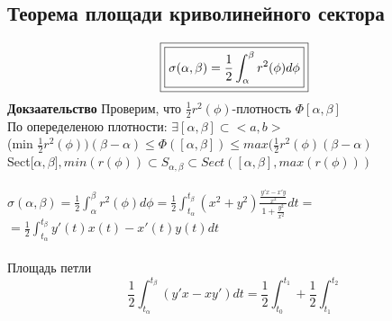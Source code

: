 \documentclass[12pt, a4paper]{article}
\begin{document}
	\subsection{Теорема площади криволинейного сектора}
	\[
	\boxed{\boxed{ \sigma(\alpha,\beta)=\frac{1}{2} \int_{\alpha}^{\beta}r^2(\phi) d\phi}}\\
	\]
	\textbf{Докзаательство}
	Проверим, что $\frac{1}{2}r^2(\phi)$-плотность $\Phi[\alpha,\beta]$\\
	По опеределеною плотности: $\exists [\alpha, \beta] \subset <a,b>$ \\
	(min $\frac{1}{2}r^2(\phi))(\beta - \alpha) \leq  \Phi([\alpha,\beta])\leq max(\frac{1}{2}r^2(\phi)( \beta -    \alpha)$\\
	Sect[$ \alpha,\beta ], min(r( \phi )) \subset S_{ \alpha,\beta } \subset Sect([ \alpha,\beta ], max(r( \phi )))$\\
	\\
	$\sigma(\alpha,\beta)=\frac{1}{2} \int_{\alpha}^{\beta}r^2(\phi) d\phi = \frac{1}{2}\int_{t_\alpha}^{t_\beta}(x^2+y^2)\frac{\frac{y'x-x'y}{x^2}}{1+\frac{y^2}{x^2}}dt =$ \\
	$=\frac{1}{2}\int_{t_\alpha}^{t_\beta}y'(t)x(t)-x'(t)y(t) dt$ \\
	\\
	Площадь петли\\
	\[
	\boxed{\boxed{ \frac{1}{2} \int_{t_\alpha}^{t_\beta}( y'x-xy' ) dt = \frac{1}{2}\int_{t_0}^{t_1}+\frac{1}{2}\int_{t_1}^{t_2} }} 
	\]
	
	
\end{document}
